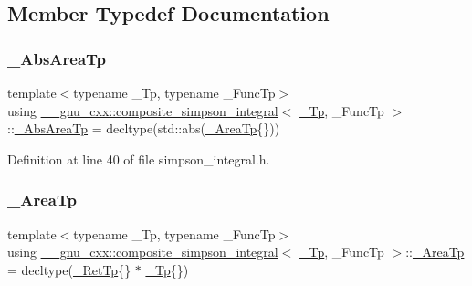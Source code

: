 \subsection{Member Typedef Documentation}
\mbox{\label{class____gnu__cxx_1_1composite__simpson__integral_a7057fa13b914730f021356f761b6c448}} 
\subsubsection{\texorpdfstring{\+\_\+\+Abs\+Area\+Tp}{\_AbsAreaTp}}
{\footnotesize\ttfamily template$<$typename \+\_\+\+Tp, typename \+\_\+\+Func\+Tp$>$ \\
using \hyperlink{class____gnu__cxx_1_1composite__simpson__integral}{\+\_\+\+\_\+gnu\+\_\+cxx\+::composite\+\_\+simpson\+\_\+integral}$<$ \hyperlink{namespace____gnu__cxx_a3b19a9c800ca194374ef9172290f7d79}{\+\_\+\+Tp}, \+\_\+\+Func\+Tp $>$\+::\hyperlink{class____gnu__cxx_1_1composite__simpson__integral_a7057fa13b914730f021356f761b6c448}{\+\_\+\+Abs\+Area\+Tp} =  decltype(std\+::abs(\hyperlink{class____gnu__cxx_1_1composite__simpson__integral_a1a3ef5313bafc1d8523f2d517b066a7a}{\+\_\+\+Area\+Tp}\{\}))}



Definition at line 40 of file simpson\+\_\+integral.\+h.

\mbox{\label{class____gnu__cxx_1_1composite__simpson__integral_a1a3ef5313bafc1d8523f2d517b066a7a}} 
\subsubsection{\texorpdfstring{\+\_\+\+Area\+Tp}{\_AreaTp}}
{\footnotesize\ttfamily template$<$typename \+\_\+\+Tp, typename \+\_\+\+Func\+Tp$>$ \\
using \hyperlink{class____gnu__cxx_1_1composite__simpson__integral}{\+\_\+\+\_\+gnu\+\_\+cxx\+::composite\+\_\+simpson\+\_\+integral}$<$ \hyperlink{namespace____gnu__cxx_a3b19a9c800ca194374ef9172290f7d79}{\+\_\+\+Tp}, \+\_\+\+Func\+Tp $>$\+::\hyperlink{class____gnu__cxx_1_1composite__simpson__integral_a1a3ef5313bafc1d8523f2d517b066a7a}{\+\_\+\+Area\+Tp} =  decltype(\hyperlink{class____gnu__cxx_1_1composite__simpson__integral_a530008576c8a3a786e84ccbd96c93cc5}{\+\_\+\+Ret\+Tp}\{\} $\ast$ \hyperlink{namespace____gnu__cxx_a3b19a9c800ca194374ef9172290f7d79}{\+\_\+\+Tp}\{\})}



